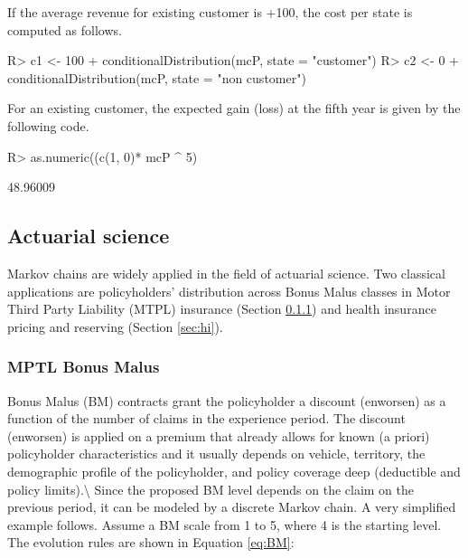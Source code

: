 \documentclass[
  nojss]{jss}
\begin{document}
If the average revenue for existing customer is +100, the cost per state is computed as follows.

\begin{CodeChunk}

\begin{CodeInput}
R> c1 <- 100 + conditionalDistribution(mcP, state = "customer") %
R> c2 <- 0 + conditionalDistribution(mcP, state = "non customer") %
\end{CodeInput}
\end{CodeChunk}

For an existing customer, the expected gain (loss) at the fifth year is given by the following code.

\begin{CodeChunk}

\begin{CodeInput}
R> as.numeric((c(1, 0)* mcP ^ 5) %
\end{CodeInput}

\begin{CodeOutput}
[1] 48.96009
\end{CodeOutput}
\end{CodeChunk}

\hypertarget{app:act}{%
\subsection{Actuarial science}\label{app:act}}

Markov chains are widely applied in the field of actuarial science. Two
classical applications are policyholders' distribution across Bonus Malus
classes in Motor Third Party Liability (MTPL) insurance (Section \ref{sec:bm}) and health insurance pricing and reserving
(Section \ref{sec:hi}).

\hypertarget{sec:bm}{%
\subsubsection{MPTL Bonus Malus}\label{sec:bm}}

Bonus Malus (BM) contracts grant the policyholder a discount (enworsen) as a function of the number of claims in the experience period. The discount (enworsen) is applied on a premium that already allows for known (a priori) policyholder characteristics \citep{denuit2007actuarial} and it usually depends on vehicle, territory, the demographic profile of the policyholder, and policy coverage deep (deductible and policy limits).\textbackslash{}
Since the proposed BM level depends on the claim on the previous period, it can be modeled by a discrete Markov chain. A very simplified example follows. Assume a BM scale from 1 to 5, where 4 is the starting level. The evolution rules are shown in Equation \ref{eq:BM}:
\end{document}
